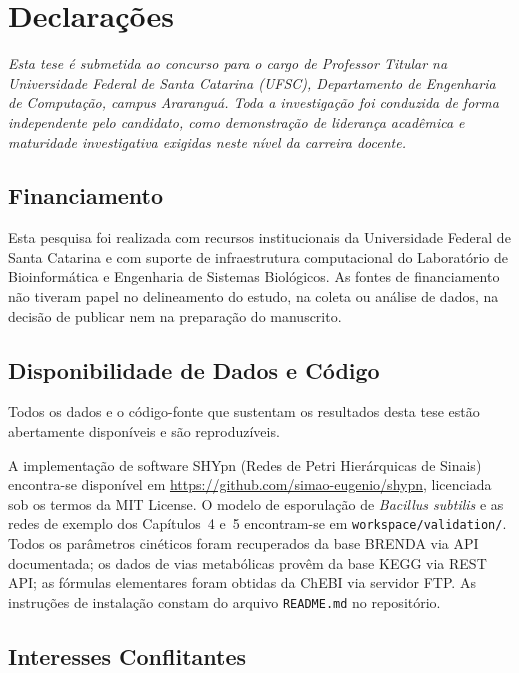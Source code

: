 \cleardoublepage
{}
\chapter*{Declarações}

\noindent\textit{Esta tese é submetida ao concurso para o cargo de
Professor Titular na Universidade Federal de Santa Catarina (UFSC),
Departamento de Engenharia de Computação, campus Araranguá. Toda a investigação
foi conduzida de forma independente pelo candidato, como demonstração de
liderança acadêmica e maturidade investigativa exigidas neste nível da carreira
docente.}

\bigskip

\section*{Financiamento}

Esta pesquisa foi realizada com recursos institucionais da Universidade Federal
de Santa Catarina e com suporte de infraestrutura computacional do Laboratório
de Bioinformática e Engenharia de Sistemas Biológicos. As fontes de financiamento
não tiveram papel no delineamento do estudo, na coleta ou análise de dados, na
decisão de publicar nem na preparação do manuscrito.

\section*{Disponibilidade de Dados e Código}

Todos os dados e o código-fonte que sustentam os resultados desta tese
estão abertamente disponíveis e são reproduzíveis.

\begin{sloppypar}
A implementação de software SHYpn (Redes de Petri Hierárquicas de Sinais)
encontra-se disponível em \url{https://github.com/simao-eugenio/shypn},
licenciada sob os termos da MIT License. O modelo de esporulação de
\textit{Bacillus subtilis} e as redes de exemplo dos Capítulos~4 e~5
encontram-se em \texttt{workspace/validation/}. Todos os parâmetros cinéticos
foram recuperados da base BRENDA via API documentada; os dados de vias
metabólicas provêm da base KEGG via REST API; as fórmulas elementares foram
obtidas da ChEBI via servidor FTP. As instruções de instalação constam do
arquivo \texttt{README.md} no repositório.
\end{sloppypar}

\section*{Interesses Conflitantes}

